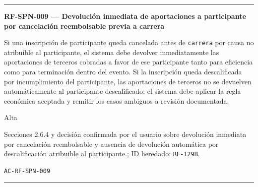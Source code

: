 \documentclass[10pt,letterpaper]{article}
\begin{document}
\vspace{0.25em}\hrule\vspace{0.65em}
\noindent\textbf{RF-SPN-009 --- Devolución inmediata de aportaciones a participante por cancelación reembolsable previa a carrera}\par
\begin{description}[style=nextline,leftmargin=3.15cm,labelwidth=2.8cm,font=\normalfont\bfseries]
\item[Obligación] Si una inscripción de participante queda cancelada antes de \texttt{carrera} por causa no atribuible al participante, el sistema debe devolver inmediatamente las aportaciones de terceros cobradas a favor de ese participante tanto para eficiencia como para terminación dentro del evento. Si la inscripción queda descalificada por incumplimiento del participante, las aportaciones de terceros no se devuelven automáticamente al participante descalificado; el sistema debe aplicar la regla económica aceptada y remitir los casos ambiguos a revisión documentada.
\item[Prioridad] Alta
\item[Procedencia] Secciones 2.6.4 y decisión confirmada por el usuario sobre devolución inmediata por cancelación reembolsable y ausencia de devolución automática por descalificación atribuible al participante.; ID heredado: \texttt{RF-129B}.
\item[Verificación] \texttt{AC-RF-SPN-009}
\end{description}
\vspace{0.25em}\hrule\vspace{0.65em}
\end{document}

